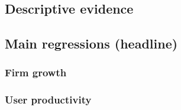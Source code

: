 \documentclass{article}
\newcommand{\cleanedresultsdir}{../../results/cleaned/tex}
\newcommand{\TableInput}[2][\linewidth]{}
\begin{document}
\subsection*{Descriptive evidence}
\begin{table}[H]
  \centering
  \caption{Sample accounting across matched and baseline backfill modes}
  \TableInput{\cleanedresultsdir/llm_equity_no_cb_modes_sample_accounting.tex}
\end{table}

\begin{table}[H]
  \centering
  \caption{Startup vs non-startup equity prevalence and additional descriptives}
  \TableInput{\cleanedresultsdir/llm_equity_no_cb_modes_descriptives.tex}
\end{table}

\subsection*{Main regressions (headline)}
\subsubsection*{Firm growth}
\begin{table}[H]
  \centering
  \caption{Firm growth: core pooled (extensive margin)}
  \TableInput{\cleanedresultsdir/llm_equity_no_cb_modes_firm_core_pooled.tex}
\end{table}

\begin{table}[H]
  \centering
  \caption{Firm growth: core split (non-equity firms)}
  \TableInput{\cleanedresultsdir/llm_equity_no_cb_modes_firm_core_split_non_equity.tex}
\end{table}

\begin{table}[H]
  \centering
  \caption{Firm growth: core split (equity firms)}
  \TableInput{\cleanedresultsdir/llm_equity_no_cb_modes_firm_core_split_equity.tex}
\end{table}

\subsubsection*{User productivity}
\begin{table}[H]
  \centering
  \caption{User productivity: core pooled (extensive margin)}
  \TableInput{\cleanedresultsdir/llm_equity_no_cb_modes_user_core_pooled.tex}
\end{table}
\end{document}
